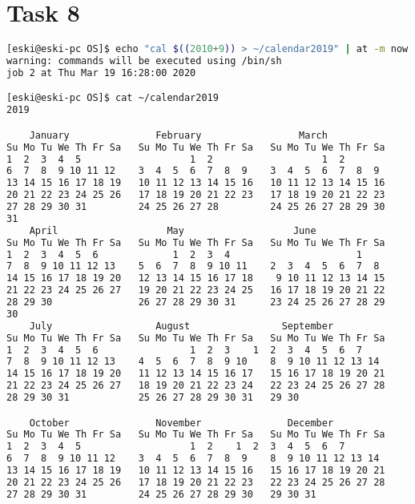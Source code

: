 \documentclass{article}
\begin{document}
\section*{Task 8}\vspace{-3mm}
\begin{lstlisting}[language=BASH]
[eski@eski-pc OS]$ echo "cal $((2010+9)) > ~/calendar2019" | at -m now +1 minute
warning: commands will be executed using /bin/sh
job 2 at Thu Mar 19 16:28:00 2020

[eski@eski-pc OS]$ cat ~/calendar2019 
2019                               

	January               February                 March       
Su Mo Tu We Th Fr Sa   Su Mo Tu We Th Fr Sa   Su Mo Tu We Th Fr Sa
1  2  3  4  5                   1  2                   1  2
6  7  8  9 10 11 12    3  4  5  6  7  8  9    3  4  5  6  7  8  9
13 14 15 16 17 18 19   10 11 12 13 14 15 16   10 11 12 13 14 15 16
20 21 22 23 24 25 26   17 18 19 20 21 22 23   17 18 19 20 21 22 23
27 28 29 30 31         24 25 26 27 28         24 25 26 27 28 29 30
31                  
	April                   May                   June        
Su Mo Tu We Th Fr Sa   Su Mo Tu We Th Fr Sa   Su Mo Tu We Th Fr Sa
1  2  3  4  5  6             1  2  3  4                      1
7  8  9 10 11 12 13    5  6  7  8  9 10 11    2  3  4  5  6  7  8
14 15 16 17 18 19 20   12 13 14 15 16 17 18    9 10 11 12 13 14 15
21 22 23 24 25 26 27   19 20 21 22 23 24 25   16 17 18 19 20 21 22
28 29 30               26 27 28 29 30 31      23 24 25 26 27 28 29
30                  
	July                  August                September     
Su Mo Tu We Th Fr Sa   Su Mo Tu We Th Fr Sa   Su Mo Tu We Th Fr Sa
1  2  3  4  5  6                1  2  3    1  2  3  4  5  6  7
7  8  9 10 11 12 13    4  5  6  7  8  9 10    8  9 10 11 12 13 14
14 15 16 17 18 19 20   11 12 13 14 15 16 17   15 16 17 18 19 20 21
21 22 23 24 25 26 27   18 19 20 21 22 23 24   22 23 24 25 26 27 28
28 29 30 31            25 26 27 28 29 30 31   29 30               

	October               November               December      
Su Mo Tu We Th Fr Sa   Su Mo Tu We Th Fr Sa   Su Mo Tu We Th Fr Sa
1  2  3  4  5                   1  2    1  2  3  4  5  6  7
6  7  8  9 10 11 12    3  4  5  6  7  8  9    8  9 10 11 12 13 14
13 14 15 16 17 18 19   10 11 12 13 14 15 16   15 16 17 18 19 20 21
20 21 22 23 24 25 26   17 18 19 20 21 22 23   22 23 24 25 26 27 28
27 28 29 30 31         24 25 26 27 28 29 30   29 30 31
\end{lstlisting}
\end{document}
